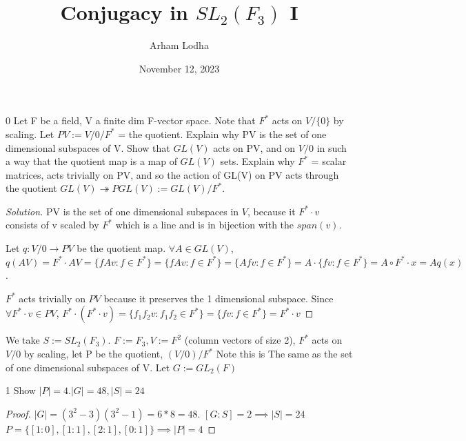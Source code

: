 \documentclass{article}
\newenvironment{solution}
{\renewcommand\qedsymbol{$\blacksquare$}\begin{proof}[Solution]}
{\end{proof}}
\begin{document}
\title{Conjugacy in $SL_2(F_3)$ I}
\author{Arham Lodha}%
\date{November 12, 2023}%
\maketitle

\begin{PROB}{0}\label{Problem 0.}
    Let F be a field, V a finite dim F-vector space. Note that $F^*$ acts on $V / \{0\}$ by scaling. Let $PV := V / 0 / F^*$ = the quotient. Explain why PV is the set of one dimensional subspaces of V. Show that $GL(V)$ acts on PV, and on $V / 0$ in such a way that the quotient map is a map of $GL(V)$ sets. Explain why $F^*$ = scalar matrices, acts trivially on PV, and so the action of GL(V) on PV acts through the quotient $GL(V) \twoheadrightarrow PGL(V) := GL(V)/F^*$.
\end{PROB}
\begin{solution}
    PV is the set of one dimensional subspaces in $V$, because it $F^* \cdot v$ consists of v scaled by $F^*$ which is a line and is in bijection with the $span(v)$.

    Let $q: V/0 \to PV$ be the quotient map. $\forall A \in GL(V)$, $q(AV) = F^* \cdot AV = \{fAv : f \in F^*\} = \{fAv : f \in F^*\} = \{Afv : f \in F^*\} = A \cdot \{fv : f \in F^*\} = A \circ F^* \cdot x = A q(x)$.

    $F^*$ acts trivially on $PV$ because it preserves the 1 dimensional subspace. Since $\forall F^* \cdot v \in PV$, $F^* \cdot (F^* \cdot v) = \{f_1f_2v : f_1f_2 \in F^*\} = \{fv : f \in F^*\} = F^* \cdot v$
\end{solution}

\bigskip

We take $S:= SL_2(F_3)$.  $F := F_3, V := F^2$ (column vectors of size 2),
$F^*$ acts on $V / 0$ by scaling, let P be the quotient, $(V / 0)/F^*$  Note this is
The same as the set of one dimensional subspaces of V. Let $G := GL_2(F)$

\begin{PROB}{1}\label{Problem 1.}
    Show $|P| = 4. |G| = 48, |S| = 24$
\end{PROB}
\begin{proof}
    $|G| = (3^2 - 3)(3^2 - 1) = 6*8 = 48$.
    $[G : S] = 2 \implies |S| = 24$
    $P = \{[1:0], [1:1], [2:1], [0:1]\} \implies |P| = 4$
\end{proof}

\bigskip
\end{document}
